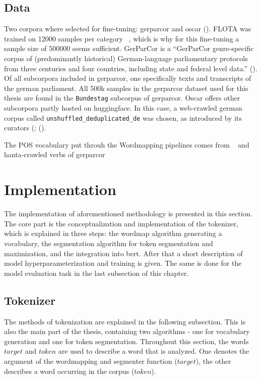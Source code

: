 \subsection{Data}
\label{subsec:data}
Two corpora where selected for fine-tuning: \ac{gerparcor} and oscar (\cite{oscar}).
FLOTA was trained on 12000 samples per  category ~\cite{FLOTA}, which is why for this fine-tuning a sample size of 500000 seems sufficient.
GerParCor is a \enquote{GerParCor genre-specific corpus of (predominantly historical) German-language parliamentary protocols from three centuries and four countries, including state and federal level data.} (\cite[1]{GERPARCOR}).
Of all subcorpora included in \ac{gerparcor}, one specifically texts and transcripts of the german parliament.
All 500k samples in the \ac{gerparcor} dataset used for this thesis are found in the \texttt{Bundestag} subcorpus of \ac{gerparcor}.
Oscar offers other subcorpora partly hosted on huggingface.
In this case, a web-crawled german corpus called \texttt{unshuffled\_deduplicated\_de} was chosen, as introduced by its curators (\textcite{oscarsub2}; (\textcite{oscarsub1}).

The POS vocabulary put throuh the Wordmapping pipelines comes from ~\textcite{wiktionary} and \ac{hanta}-crawled verbs of gerparcor ~\cite{hanta}


\section{Implementation}
\label{sec:implementation}

The implementation of aforementioned methodology is presented in this section.
The core part is the conceptualization and implementation of the tokenizer, which is explained in three steps:
the wordmap algorithm generating a vocabulary, the segmentation algorithm for token segmentation and maximization, and the integration into \ac{bert}.
After that a short description of model hyperparameterization and training is given.
The same is done for the model evaluation task in the last subsection of this chapter.

\subsection{Tokenizer}
\label{subsec:tokenizer}
The methods of tokenization are explained in the following subsection.
This is also the main part of the thesis, containing two algorithms - one for vocabulary generation and one for token segmentation.
Throughout this section, the words $target$ and $token$ are used to describe a word that is analyzed.
One denotes the argument of the wordmapping and segmenter function ($target$), the other describes a word occurring in the corpus ($token$).

